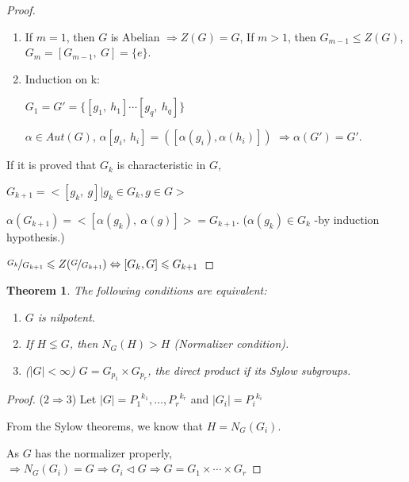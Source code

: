 \documentclass[12pt, a4paper]{article}
\newtheorem{theorem}{Theorem}[section]
\theoremstyle{definition}
\begin{document}
\begin{proof}
    \begin{enumerate}
        \item If $m=1$, then $G$ is Abelian $\Rightarrow Z(G)=G$, If $m>1$, then 
        $G_{m-1}\leqslant Z(G)$, $G_m=[G_{m-1},\ G] = \{e\}$.
        \item Induction on k:
        \par
        $G_1 = G' = \{[g_1,\ h_1] \cdots [g_q,\ h_q]\} $
        \par
        $\alpha\in Aut(G) $, $\alpha [g_i,\ h_i]=([\alpha(g_i), \alpha(h_i)]) $
        $\Rightarrow\alpha (G')=G' $.
    \end{enumerate}
    If it is proved that $G_k$ is characteristic in $G$,\par
    $G_{k+1} = <[g_k,\ g]|g_k \in G_k, g\in G>$ \par
    $\alpha (G_{k+1}) = <[\alpha(g_k),\ \alpha(g)]> =G_{k+1}$. ($\alpha(g_k)\in G_k $ 
    -by induction hypothesis.)\par
    $\nicefrac{G_k}{G_{k+1}} \leqslant Z(\nicefrac{G}{G_{k+1}})\Leftrightarrow 
    [G_k, G] \leqslant  G_{k+1} $
    \par
\end{proof}
\begin{theorem}
    The following conditions are equivalent:
    \begin{enumerate}
        \item $G$ is nilpotent.
        \item If $H\lneq G$, then $N_G(H) > H $ (Normalizer condition).
        \item ($|G|<\infty $) $G = G_{p_1}\times G_{p_r} $, the direct product if its Sylow 
        subgroups.
    \end{enumerate}
\end{theorem}
\begin{proof}
    ($2\Rightarrow 3$) Let $|G| = {P_1}^{k_1},\ldots,{P_r}^{k_r} $ and $|G_i| = {P_i}^{k_i}$
    \par
    From the Sylow theorems, we know that $H = N_G(G_i)$.\par
    As $G$ has the normalizer properly, $\Rightarrow N_G(G_i)=G\Rightarrow G_i\lhd G
    \Rightarrow G= G_1\times \cdots \times G_r$
    \par
\end{proof}
\newpage
\end{document}
